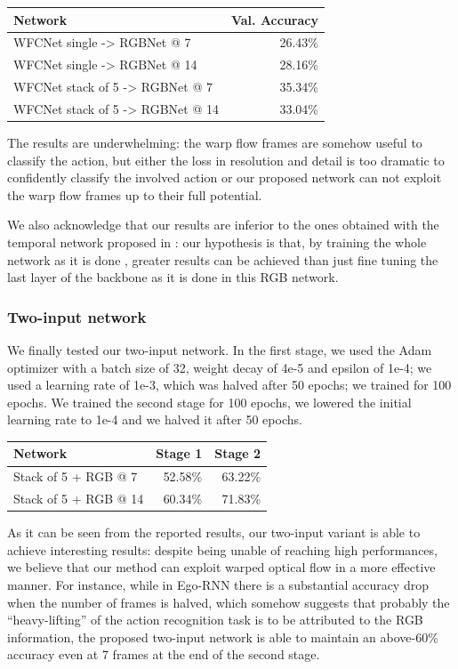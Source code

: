 \documentclass[10pt,twocolumn,letterpaper]{article}
\begin{document}
\vspace{12pt} \noindent
\begin{tabular}{l|r}
	Network & Val. Accuracy \\
	\hline
	WFCNet single -> RGBNet @ 7 & 26.43\% \\
	WFCNet single -> RGBNet @ 14 & 28.16\% \\
	\hline
	WFCNet stack of 5 -> RGBNet @ 7 & 35.34\% \\
	WFCNet stack of 5 -> RGBNet @ 14 & 33.04\% \\
\end{tabular} \vspace{6pt}

The results are underwhelming: the warp flow frames are somehow useful to classify the action, but either the loss in resolution and detail is too dramatic to confidently classify the involved action or our proposed network can not exploit the warp flow frames up to their full potential.

We also acknowledge that our results are inferior to the ones obtained with the temporal network proposed in \cite{Ego-RNN}: our hypothesis is that, by training the whole network as it is done \cite{Ego-RNN}, greater results can be achieved than just fine tuning the last layer of the backbone as it is done in this RGB network.

\subsubsection{Two-input network}

We finally tested our two-input network. In the first stage, we used the Adam optimizer with a batch size of 32, weight decay of 4e-5 and epsilon of 1e-4; we used a learning rate of 1e-3, which was halved after 50 epochs; we trained for 100 epochs. We trained the second stage for 100 epochs, we lowered the initial learning rate to 1e-4 and we halved it after 50 epochs.

\vspace{12pt} \noindent
\begin{tabular}{l|rr}
	Network & Stage 1 & Stage 2 \\
	\hline
	Stack of 5 + RGB @ 7 & 52.58\% & 63.22\% \\
    Stack of 5 + RGB @ 14 & 60.34\% & 71.83\% \\
\end{tabular} \vspace{6pt}

As it can be seen from the reported results, our two-input variant is able to achieve interesting results: despite being unable of reaching high performances, we believe that our method can exploit warped optical flow in a more effective manner. For instance, while in Ego-RNN there is a substantial accuracy drop when the number of frames is halved, which somehow suggests that probably the ``heavy-lifting'' of the action recognition task is to be attributed to the RGB information, the proposed two-input network is able to maintain an above-60\% accuracy even at 7 frames at the end of the second stage.
\end{document}
